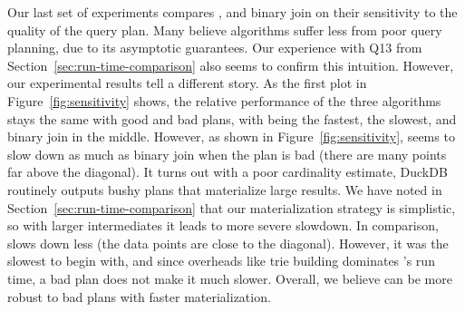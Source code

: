 Our last set of experiments compares \FJ, \GJ and binary join 
  on their sensitivity to the quality of the query plan.
Many believe \WCOJ algorithms suffer less from poor query planning,
  due to its asymptotic guarantees.
Our experience with Q13 from Section~\ref{sec:run-time-comparison}
  also seems to confirm this intuition.
However, our experimental results tell a different story.
As the first plot in Figure~\ref{fig:sensitivity} shows, 
  the relative performance of the three algorithms stays 
  the same with good and bad plans, with \FJ being the fastest,
  \GJ the slowest, and binary join in the middle.
However, as shown in Figure~\ref{fig:sensitivity},
  \FJ seems to slow down as much as binary join 
  when the plan is bad (there are many points far above the diagonal).
It turns out with a poor cardinality estimate, 
  DuckDB routinely outputs bushy plans that materialize large results.
We have noted in Section~\ref{sec:run-time-comparison} that 
  our materialization strategy is simplistic, 
  so with larger intermediates it leads to more severe slowdown.
In comparison, \GJ slows down less (the data points are close to the diagonal).
However, it was the slowest to begin with,
  and since overheads like trie building dominates \GJ's run time, 
  a bad plan does not make it much slower.
Overall, we believe \FJ can be more robust to bad plans with 
  faster materialization.
